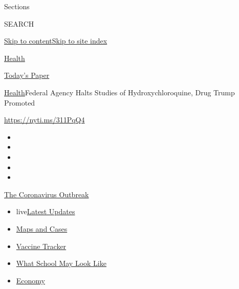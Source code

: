 Sections

SEARCH

\protect\hyperlink{site-content}{Skip to
content}\protect\hyperlink{site-index}{Skip to site index}

\href{https://www.nytimes.com/section/health}{Health}

\href{https://myaccount.nytimes.com/auth/login?response_type=cookie\&client_id=vi}{}

\href{https://www.nytimes.com/section/todayspaper}{Today's Paper}

\href{/section/health}{Health}\textbar{}Federal Agency Halts Studies of
Hydroxychloroquine, Drug Trump Promoted

\url{https://nyti.ms/311PqQ4}

\begin{itemize}
\item
\item
\item
\item
\item
\end{itemize}

\href{https://www.nytimes.com/news-event/coronavirus?action=click\&pgtype=Article\&state=default\&region=TOP_BANNER\&context=storylines_menu}{The
Coronavirus Outbreak}

\begin{itemize}
\tightlist
\item
  live\href{https://www.nytimes.com/2020/08/01/world/coronavirus-covid-19.html?action=click\&pgtype=Article\&state=default\&region=TOP_BANNER\&context=storylines_menu}{Latest
  Updates}
\item
  \href{https://www.nytimes.com/interactive/2020/us/coronavirus-us-cases.html?action=click\&pgtype=Article\&state=default\&region=TOP_BANNER\&context=storylines_menu}{Maps
  and Cases}
\item
  \href{https://www.nytimes.com/interactive/2020/science/coronavirus-vaccine-tracker.html?action=click\&pgtype=Article\&state=default\&region=TOP_BANNER\&context=storylines_menu}{Vaccine
  Tracker}
\item
  \href{https://www.nytimes.com/interactive/2020/07/29/us/schools-reopening-coronavirus.html?action=click\&pgtype=Article\&state=default\&region=TOP_BANNER\&context=storylines_menu}{What
  School May Look Like}
\item
  \href{https://www.nytimes.com/live/2020/07/31/business/stock-market-today-coronavirus?action=click\&pgtype=Article\&state=default\&region=TOP_BANNER\&context=storylines_menu}{Economy}
\end{itemize}

